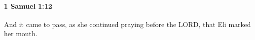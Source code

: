 
		\paragraph{1 Samuel 1:12} %
			\label{1SAMUEL-1-12}

			And it came to pass, as she continued praying before the LORD, that Eli marked her mouth.


